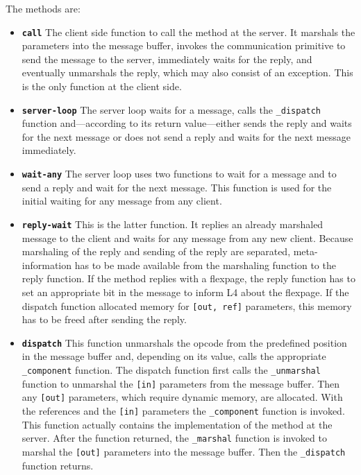 The methods are:
\begin{itemize}
\item \textbf{\texttt{call}} The client side function to call the method
      at the server.  It marshals the parameters into the message buffer,
      invokes the communication primitive to send the message to the server,
      immediately waits for the reply, and eventually unmarshals the reply,
      which may also consist of an exception.  This is the only function
      at the client side.

\item \textbf{\texttt{server-loop}} The server loop waits for a message,
      calls the \verb|_dispatch| function and---according to its return 
      value---either sends the reply and waits for the next message or
      does not send a reply and waits for the next message immediately.

\item \textbf{\texttt{wait-any}} The server loop uses two functions to wait
      for a message and to send a reply and wait for the next message.
      This function is used for the initial waiting for any message from
      any client.

\item \textbf{\texttt{reply-wait}} This is the latter function.  It replies
      an already marshaled message to the client and waits for any message
      from any new client.  Because marshaling of the reply and sending
      of the reply are separated, meta-information has to be made available
      from the marshaling function to the reply function.  If the method
      replies with a flexpage, the reply function has to set an appropriate 
      bit in the message to inform L4 about the flexpage.  If the dispatch
      function allocated memory for \verb|[out, ref]| parameters, this memory
      has to be freed after sending the reply.

\item \textbf{\texttt{dispatch}} This function unmarshals the opcode from
      the predefined position in the message buffer and, depending on its
      value, calls the appropriate \verb|_component| function.  The dispatch
      function first calls the \verb|_unmarshal| function to unmarshal the
      \verb|[in]| parameters from the message buffer.  Then any \verb|[out]|
      parameters, which require dynamic memory, are allocated.  With the
      references and the \verb|[in]| parameters the \verb|_component| function
      is invoked.  This function actually contains the implementation of the
      method at the server.  After the function returned, the \verb|_marshal|
      function is invoked to marshal the \verb|[out]| parameters into the
      message buffer.  Then the \verb|_dispatch| function returns.


\end{itemize}
